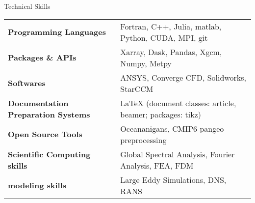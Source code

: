 \documentclass{resume} %
\begin{document}

\begin{rSection}{Technical Skills}

\begin{tabular}{ @{} >{\bfseries}l @{\hspace{6ex}} l }
Programming Languages & Fortran, C++, Julia, matlab, Python, CUDA, MPI, git \\
Packages \& APIs & Xarray, Dask, Pandas, Xgcm, Numpy, Metpy \\
Softwares & ANSYS, Converge CFD, Solidworks, StarCCM \\
Documentation Preparation Systems &  LaTeX (document classes: article, beamer; packages: tikz)\\
Open Source Tools & Oceananigans, CMIP6 pangeo preprocessing\\
Scientific Computing skills & Global Spectral Analysis, Fourier Analysis, FEA, FDM\\
modeling skills & Large Eddy Simulations, DNS, RANS
\end{tabular}

\end{rSection}
\end{document}
